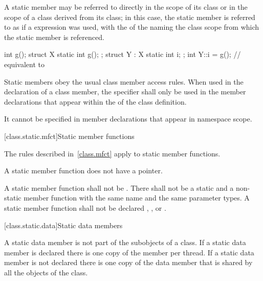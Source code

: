 \pnum
A static member may be referred to directly in the scope of its
class or in the scope of a class derived
from its class; in this case, the static member is referred to
as if a  expression was used, with the
 of the  naming
the class scope from which the static member is referenced.
\begin{example}
\begin{codeblock}
int g();
struct X {
  static int g();
};
struct Y : X {
  static int i;
};
int Y::i = g();                 // equivalent to 
\end{codeblock}
\end{example}

\pnum
Static members obey the usual class member access rules.
When used in the declaration of a class
member, the  specifier shall only be used in the member
declarations that appear within the  of
the class definition.
\begin{note}
It cannot be specified in member declarations that appear in namespace scope.
\end{note}

[class.static.mfct]{Static member functions}
%

\pnum
\begin{note}
The rules described in~\ref{class.mfct} apply to static member
functions.
\end{note}

\pnum
\begin{note}
A static member function does not have a 
pointer.
\end{note}
A static member function shall not be . There
shall not be a static and a non-static member function with the
same name and the same parameter types. A
static member function shall not be declared ,
, or .

[class.static.data]{Static data members}
%

\pnum
A static data member is not part of the subobjects of a class. If a
static data member is declared  there is one copy of
the member per thread. If a static data member is not declared
 there is one copy of the data member that is shared by all
the objects of the class.

